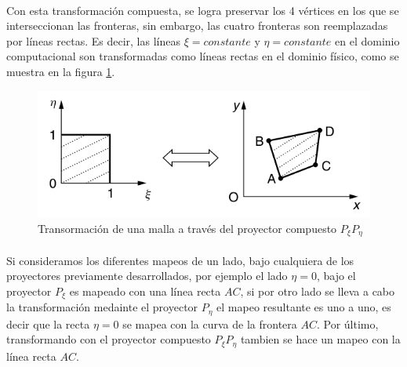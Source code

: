 \documentclass[letterpaper, openright, 12pt]{book}
\begin{document}
			\paragraph*{}
				Con esta transformación compuesta, se logra preservar los 4 vértices en los que se interseccionan las fronteras, sin embargo, las cuatro fronteras son reemplazadas por líneas rectas. Es decir, las líneas $\xi = constante$ y $\eta = constante$ en el dominio computacional son transformadas como líneas rectas en el dominio físico, como se muestra en la figura \ref{fig:mapeo_xieta}.
			\begin{figure}[htbp!]
				\centering
				\includegraphics[width=120mm]{./Imagenes/mapeo_xieta}
				\caption[Transformación de malla por $P_{\xi}P_{\eta}$]{Transormación de una malla a través del proyector compuesto $P_{\xi}P_{\eta}$ \cite{farrashkhalvat}}
				\label{fig:mapeo_xieta}
			\end{figure}
			
			\paragraph*{}
				Si consideramos los diferentes mapeos de un lado, bajo cualquiera de los proyectores previamente desarrollados, por ejemplo el lado $\eta = 0$, bajo el proyector $P_{\xi}$ es mapeado con una línea recta $AC$, si por otro lado se lleva a cabo la transformación medainte el proyector $P_{\eta}$ el mapeo resultante es uno a uno, es decir que la recta $\eta = 0$ se mapea con la curva de la frontera $AC$. Por último, transformando con el proyector compuesto $P_{\xi}P_{\eta}$ tambien se hace un mapeo con la línea recta $AC$.
\end{document}

